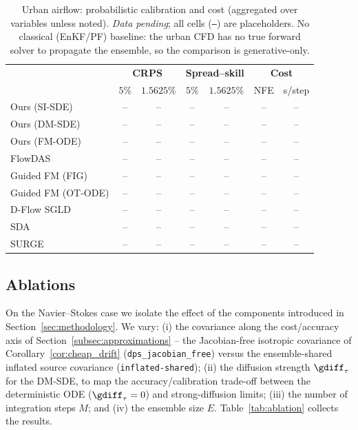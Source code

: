 \begin{table}[ht]
    \centering
    \small
    \caption{Urban airflow: probabilistic calibration and cost (aggregated over variables unless noted). \emph{Data pending}; all cells (\texttt{--}) are placeholders. No classical (EnKF/PF) baseline: the urban CFD has no true forward solver to propagate the ensemble, so the comparison is generative-only.}
    \label{tab:urban_calibration_cost}
    \begin{tabular}{l|cc|cc|cc}
        \toprule
        & \multicolumn{2}{c|}{\textbf{CRPS}}
        & \multicolumn{2}{c|}{\textbf{Spread--skill}}
        & \multicolumn{2}{c}{\textbf{Cost}} \\
        & $5\%$ & $1.5625\%$ & $5\%$ & $1.5625\%$ & NFE & s/step \\
        \midrule
        Ours (SI-SDE) & -- & -- & -- & -- & -- & -- \\
        Ours (DM-SDE) & -- & -- & -- & -- & -- & -- \\
        Ours (FM-ODE) & -- & -- & -- & -- & -- & -- \\
        \midrule
        FlowDAS & -- & -- & -- & -- & -- & -- \\
        Guided FM (FIG) & -- & -- & -- & -- & -- & -- \\
        Guided FM (OT-ODE) & -- & -- & -- & -- & -- & -- \\
        D-Flow SGLD & -- & -- & -- & -- & -- & -- \\
        SDA & -- & -- & -- & -- & -- & -- \\
        SURGE & -- & -- & -- & -- & -- & -- \\
        \bottomrule
    \end{tabular}
\end{table}

\subsection{Ablations}
\label{subsec:results_ablations}
On the Navier--Stokes case we isolate the effect of the components introduced in Section~\ref{sec:methodology}. We vary: (i) the covariance along the cost/accuracy axis of Section~\ref{subsec:approximations} -- the Jacobian-free isotropic covariance of Corollary~\ref{cor:cheap_drift} (\texttt{dps\_jacobian\_free}) versus the ensemble-shared inflated source covariance (\texttt{inflated-shared}); (ii) the diffusion strength $\gdiff_\tau$ for the DM-SDE, to map the accuracy/calibration trade-off between the deterministic ODE ($\gdiff_\tau=0$) and strong-diffusion limits; (iii) the number of integration steps $M$; and (iv) the ensemble size $E$. Table~\ref{tab:ablation} collects the results.

